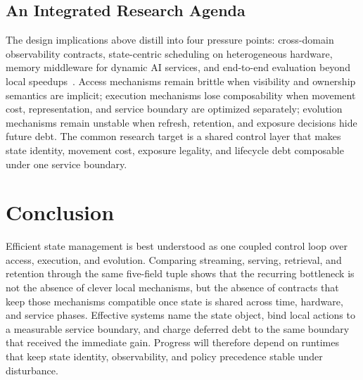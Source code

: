 \documentclass[manuscript]{acmart}
\begin{document}
\subsection{An Integrated Research Agenda}

The design implications above distill into four pressure points: cross-domain observability contracts, state-centric scheduling on heterogeneous hardware, memory middleware for dynamic AI services, and end-to-end evaluation beyond local speedups~\cite{zhang2019briskstream,zhang2020finestream,kwon2023pagedattention,sheng2023flexgen,cong2026mico,zhang2026neuromem,liu2026sage}. Access mechanisms remain brittle when visibility and ownership semantics are implicit; execution mechanisms lose composability when movement cost, representation, and service boundary are optimized separately; evolution mechanisms remain unstable when refresh, retention, and exposure decisions hide future debt. The common research target is a shared control layer that makes state identity, movement cost, exposure legality, and lifecycle debt composable under one service boundary.

\section{Conclusion}
\label{sec:conclusion}

Efficient state management is best understood as one coupled control loop over access, execution, and evolution. Comparing streaming, serving, retrieval, and retention through the same five-field tuple shows that the recurring bottleneck is not the absence of clever local mechanisms, but the absence of contracts that keep those mechanisms compatible once state is shared across time, hardware, and service phases. Effective systems name the state object, bind local actions to a measurable service boundary, and charge deferred debt to the same boundary that received the immediate gain. Progress will therefore depend on runtimes that keep state identity, observability, and policy precedence stable under disturbance.

\clearpage



\end{document}
